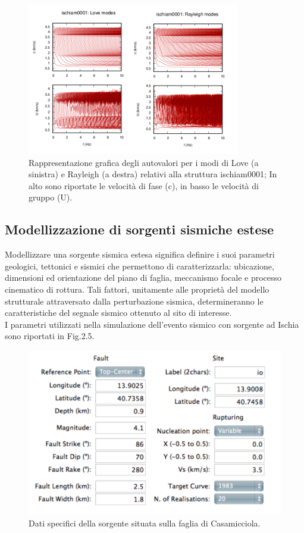 \documentclass[a4paper,12pt,titlepage]{article}
\begin{document}
\begin{figure}[htbp]
 \centering
 \includegraphics[width=.5\linewidth]{Img/IscModes.png}
 \caption{Rappresentazione grafica degli autovalori per i modi di  Love (a sinistra) e Rayleigh (a
destra) relativi alla struttura ischiam0001; In alto sono
riportate le velocità di fase (c), in basso le velocità di gruppo (U).}
 \label{fig:IscModes}
\end{figure}

\subsection{Modellizzazione di sorgenti sismiche estese}

Modellizzare una sorgente sismica estesa significa definire i suoi parametri geologici, tettonici e sismici che permettono di caratterizzarla: ubicazione, dimensioni ed orientazione del piano di faglia, meccanismo focale e processo cinematico di rottura. Tali fattori, unitamente alle proprietà del modello strutturale attraversato dalla perturbazione sismica, determineranno le caratteristiche del segnale sismico ottenuto al sito di interesse.\\
I parametri utilizzati nella simulazione dell'evento sismico con sorgente ad Ischia sono riportati in Fig.2.5.

\begin{figure}[htbp]
 \centering
 \includegraphics[width=.5\linewidth]{Img/Paratmeters.png}
 \caption{Dati specifici della sorgente situata sulla faglia di Casamicciola.}
 \label{fig:Paratmeters}
\end{figure}
\end{document}
